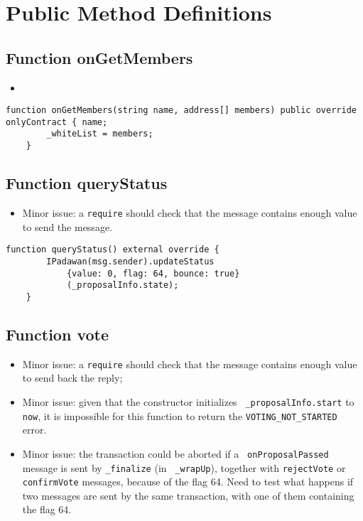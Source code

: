 \section{Public Method Definitions}

\subsection{Function onGetMembers}

\begin{itemize}
\item {}
\end{itemize}

\begin{lstlisting}[firstnumber=220]
    function onGetMembers(string name, address[] members) public override onlyContract { name;
        _whiteList = members;
    }
\end{lstlisting}

\subsection{Function queryStatus}

\begin{itemize}
\item Minor issue: a {\tt require} should check that the message
  contains enough value to send the message.
\end{itemize}

\begin{lstlisting}[firstnumber=191]
    function queryStatus() external override {
        IPadawan(msg.sender).updateStatus
            {value: 0, flag: 64, bounce: true}
            (_proposalInfo.state);
    }
\end{lstlisting}

\subsection{Function vote}

\begin{itemize}
\item Minor issue: a {\tt require} should check that the message
  contains enough value to send back the reply;
\item Minor issue: given that the constructor initializes {\tt
  \_proposalInfo.start} to {\tt now}, it is impossible for this
  function to return the {\tt VOTING\_NOT\_STARTED} error.
\item Minor issue: the transaction could be aborted if a {\tt
  onProposalPassed} message is sent by {\tt \_finalize} (in {\tt
  \_wrapUp}), together with {\tt rejectVote} or {\tt confirmVote}
  messages, because of the flag 64.  Need to test what happens if two
  messages are sent by the same transaction, with one of them
  containing the flag 64.
\end{itemize}



